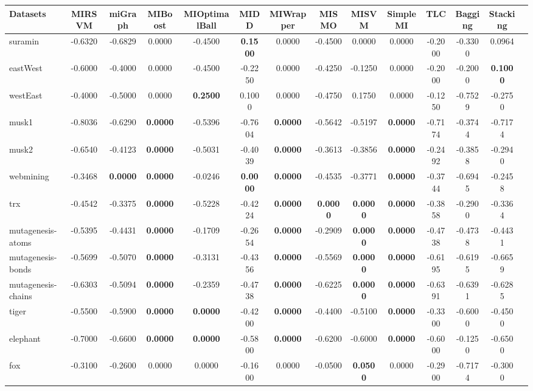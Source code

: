 \begin{threeparttable}
\begin{tabular}{lccccccccccccc}
\toprule
Datasets &MIRSVM &miGraph &MIBoost &MIOptimalBall &MIDD &MIWrapper &MISMO &MISVM &SimpleMI &TLC &Bagging &Stacking \\
\midrule
suramin &-0.6320 &-0.6829 &0.0000 &-0.4500 &\textbf{0.1500} &0.0000 &-0.4500 &0.0000 &0.0000 &-0.2000 &-0.3300 &0.0964 &  \\
eastWest &-0.6000 &-0.4000 &0.0000 &-0.4500 &-0.2250 &0.0000 &-0.4250 &-0.1250 &0.0000 &-0.2000 &-0.2000 &\textbf{0.1000} &  \\
westEast &-0.4000 &-0.5000 &0.0000 &\textbf{0.2500} &0.1000 &0.0000 &-0.4750 &0.1750 &0.0000 &-0.1250 &-0.7529 &-0.2750 &  \\
musk1 &-0.8036 &-0.6290 &\textbf{0.0000} &-0.5396 &-0.7604 &\textbf{0.0000} &-0.5642 &-0.5197 &\textbf{0.0000} &-0.7174 &-0.3744 &-0.7174 &  \\
musk2 &-0.6540 &-0.4123 &\textbf{0.0000} &-0.5031 &-0.4039 &\textbf{0.0000} &-0.3613 &-0.3856 &\textbf{0.0000} &-0.2492 &-0.3858 &-0.2940 &  \\
webmining &-0.3468 &\textbf{0.0000} &\textbf{0.0000} &-0.0246 &\textbf{0.0000} &\textbf{0.0000} &-0.4535 &-0.3771 &\textbf{0.0000} &-0.3744 &-0.6945 &-0.2458 &  \\
trx &-0.4542 &-0.3375 &\textbf{0.0000} &-0.5228 &-0.4224 &\textbf{0.0000} &\textbf{0.0000} &\textbf{0.0000} &\textbf{0.0000} &-0.3858 &-0.2900 &-0.3364 &  \\
mutagenesis-atoms &-0.5395 &-0.4431 &\textbf{0.0000} &-0.1709 &-0.2654 &\textbf{0.0000} &-0.2909 &\textbf{0.0000} &\textbf{0.0000} &-0.4738 &-0.4738 &-0.4431 &  \\
mutagenesis-bonds &-0.5699 &-0.5070 &\textbf{0.0000} &-0.3131 &-0.4356 &\textbf{0.0000} &-0.5569 &\textbf{0.0000} &\textbf{0.0000} &-0.6195 &-0.6195 &-0.6659 &  \\
mutagenesis-chains &-0.6303 &-0.5094 &\textbf{0.0000} &-0.2359 &-0.4738 &\textbf{0.0000} &-0.6225 &\textbf{0.0000} &\textbf{0.0000} &-0.6391 &-0.6391 &-0.6285 &  \\
tiger &-0.5500 &-0.5900 &\textbf{0.0000} &\textbf{0.0000} &-0.4200 &\textbf{0.0000} &-0.4400 &-0.5100 &\textbf{0.0000} &-0.3300 &-0.6000 &-0.4500 &  \\
elephant &-0.7000 &-0.6600 &\textbf{0.0000} &\textbf{0.0000} &-0.5800 &\textbf{0.0000} &-0.6200 &-0.6000 &\textbf{0.0000} &-0.6000 &-0.1250 &-0.6500 &  \\
fox &-0.3100 &-0.2600 &0.0000 &0.0000 &-0.1600 &0.0000 &-0.0500 &\textbf{0.0500} &0.0000 &-0.2900 &-0.7174 &-0.3000 &  \\

\end{tabular}
\end{threeparttable}
